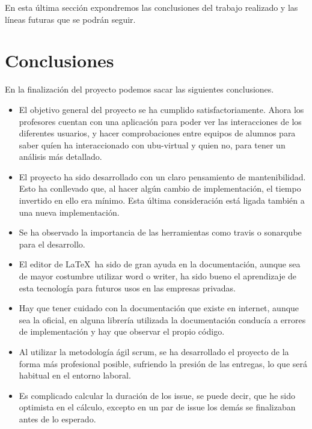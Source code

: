 
En esta última sección expondremos las conclusiones del trabajo realizado y las líneas futuras que se podrán seguir.

\section{Conclusiones}\label{conclusiones}

En la finalización del proyecto podemos sacar las siguientes conclusiones.

\begin{itemize}
	\tightlist
	\item
	El objetivo general del proyecto se ha cumplido satisfactoriamente.
	Ahora los profesores cuentan con una aplicación para poder ver las interacciones de los diferentes usuarios, y hacer comprobaciones entre equipos de alumnos para saber quíen ha interaccionado con ubu-virtual y quien no, para tener un análisis más detallado.
	\item
	El proyecto ha sido desarrollado con un claro pensamiento de mantenibilidad. Esto ha conllevado que, al hacer algún cambio de implementación, el tiempo invertido en ello era mínimo. Esta última consideración está ligada también a una nueva implementación.
	\item
	Se ha observado la importancia de las herramientas como travis o sonarqube para el desarrollo.
	\item
	El editor de \LaTeX\ ha sido de gran ayuda en la documentación, aunque sea de mayor costumbre utilizar word o writer, ha sido bueno el aprendizaje de esta tecnología para futuros usos en las empresas privadas.
	\item
	Hay que tener cuidado con la documentación que existe en internet, aunque sea la oficial, en alguna librería utilizada la documentación conducía a errores de implementación y hay que observar el propio código.
	\item
	Al utilizar la metodología ágil scrum, se ha desarrollado el proyecto de la forma más profesional posible, sufriendo la presión de las entregas, lo que será habitual en el entorno laboral.
	\item
	Es complicado calcular la duración de los issue, se puede decir, que he sido optimista en el cálculo, excepto en un par de issue los demás se finalizaban antes de lo esperado.
	
\end{itemize}

